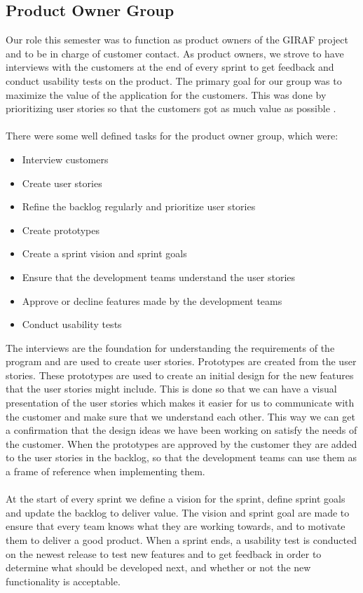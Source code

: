 \subsection{Product Owner Group}
Our role this semester was to function as product owners of the GIRAF project and to be in charge of customer contact. 
As product owners, we strove to have interviews with the customers at the end of every sprint to get feedback and conduct usability tests on the product.
The primary goal for our group was to maximize the value of the application for the customers. 
This was done by prioritizing user stories so that the customers got as much value as possible \autocite{TheScrumGuide}.\\
\\
There were some well defined tasks for the product owner group, which were:
\begin{itemize}
    \item Interview customers
    \item Create user stories    
    \item Refine the backlog regularly and prioritize user stories
    \item Create prototypes
    \item Create a sprint vision and sprint goals
    \item Ensure that the development teams understand the user stories
    \item Approve or decline features made by the development teams
    \item Conduct usability tests
\end{itemize}
\noindent
The interviews are the foundation for understanding the requirements of the program and are used to create user stories. 
Prototypes are created from the user stories.
These prototypes are used to create an initial design for the new features that the user stories might include. 
This is done so that we can have a visual presentation of the user stories which makes it easier for us to communicate with the customer and make sure that we understand each other. 
This way we can get a confirmation that the design ideas we have been working on satisfy the needs of the customer.
When the prototypes are approved by the customer they are added to the user stories in the backlog, so that the development teams can use them as a frame of reference when implementing them.
\\\\
At the start of every sprint we define a vision for the sprint, define sprint goals and update the backlog to deliver value. 
The vision and sprint goal are made to ensure that every team knows what they are working towards, and to motivate them to deliver a good product.
When a sprint ends, a usability test is conducted on the newest release to test new features and to get feedback in order to determine what should be developed next, and whether or not the new functionality is acceptable.


